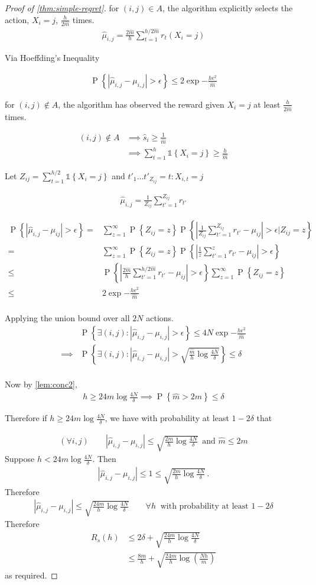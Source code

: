 \documentclass{article}
\newcommand{\set}[1]{\left\{#1\right\}}
\newcommand{\ind}[1]{\mathds{1}\!\!\set{#1}}
\newcommand{\eqn}[1]{\begin{align}#1\end{align}}
\newcommand{\eq}[1]{\begin{align*}#1\end{align*}}
\renewcommand{\P}[1]{\operatorname{P}\left\{#1\right\}}
\theoremstyle{plain}
\theoremstyle{definition}
\begin{document}
\begin{proof}[Proof of \cref{thm:simple-regret}]


for $(i,j)\in A$, the algorithm explicitly selects the action, $X_i = j$,  $\frac{h}{2\hat m}$ times.
\eq {
\hat \mu_{i,j} = \frac{2\hat m}{h} \sum_{t=1}^{h/2\hat m} r_t(X_i = j)
}

Via Hoeffding's Inequality

\eq {
\P{ \left|\hat \mu_{i,j} - \mu_{i,j}\right| > \epsilon } \leq 2\exp{-\frac{h\epsilon^2}{\hat{m}}}
}

for $(i,j)\notin A$, the algorithm has observed the reward given $X_i = j$ at least $\frac{h}{2\hat m}$ times.

\eq {
(i,j)\notin A & \implies \hat{s}_i \geq \frac{1}{\hat m} \\
& \implies \sum_{t=1}^h \ind{X_i = j} \geq \frac{h}{\hat{m}}
}

Let  $Z_{ij} = \sum_{t=1}^{h/2} \ind{X_i = j}$ and $t'_1 ... t'_{Z_{ij}} = {t:X_{i,t} = j}$

\eq {
\hat \mu_{i,j} = \frac{1}{Z_{ij}}\sum_{t'=1}^{Z_{ij}}r_{t'}
}


\eq {
\P{\left| \hat \mu_{i,j} - \mu_{ij} \right| > \epsilon} = & \sum_{z=1}^\infty \P{Z_{ij}=z}\P{\left| \frac{1}{Z_{ij}} \sum_{t'=1}^{Z_{ij}}r_{t'} - \mu_{ij} \right| > \epsilon | Z_{ij} = z} \\
= & \sum_{z=1}^\infty \P{Z_{ij}=z}\P{\left| \frac{1}{z} \sum_{t'=1}^{z}r_{t'} - \mu_{ij} \right| > \epsilon } \\
\leq & \P{\left| \frac{2\hat m}{h} \sum_{t'=1}^{h/2\hat m}r_{t'} - \mu_{ij} \right| > \epsilon } \sum_{z=1}^\infty \P{Z_{ij}=z} \\
\leq & 2\exp{-\frac{h\epsilon^2}{\hat{m}}}\\
}

Applying the union bound over all $2N$ actions.
\eq{
& \P{\exists (i,j): \left| \hat \mu_{i,j} - \mu_{i,j} \right| > \epsilon} \leq 4N\exp{-\frac{h\epsilon^2}{\hat{m}}} \\
\implies & \P{\exists (i,j): \left| \hat \mu_{i,j} - \mu_{i,j} \right| > \sqrt{\frac{\hat m}{h}\log{\frac{4N}{\delta}}}} \leq \delta \\
}

Now by \cref{lem:conc2}, 
\eq{
h \geq 24m \log \frac{4N}{\delta} \implies \P{\hat m > 2m} \leq \delta
} 

Therefore if $h \geq 24m \log \frac{4N}{\delta}$, we have with probability at least $1 - 2\delta$ that

\eqn{
\label{eqn:joint_bound_estimates_m}
(\forall i, j) \qquad \left|\hat \mu_{i,j} - \mu_{i,j}\right| \leq \sqrt{\frac{2m}{h} \log\frac{4N}{\delta}}\, \text { and } \hat{m} \leq 2m
}
Suppose $h < 24m \log \frac{4N}{\delta}$. Then
\eq{
\left|\hat \mu_{i,j} - \mu_{i,j}\right| \leq 1 \leq \sqrt{\frac{2m}{h} \log \frac{4N}{\delta}}\,.
}
Therefore
\eq{
\left|\hat \mu_{i,j} - \mu_{i,j}\right| \leq \sqrt{\frac{24m}{h} \log \frac{4N}{\delta}} \qquad \forall h\ \text{ with probability at least } 1-2\delta
}
Therefore 
\eq{
R_s(h) 
&\leq 2\delta + \sqrt{\frac{24m}{h} \log \frac{4N}{\delta}} \\
&\leq \frac{8m}{h} + \sqrt{\frac{24m}{h} \log \left(\frac{Nh}{m}\right)}
}
as required.
\end{proof}
\end{document}
